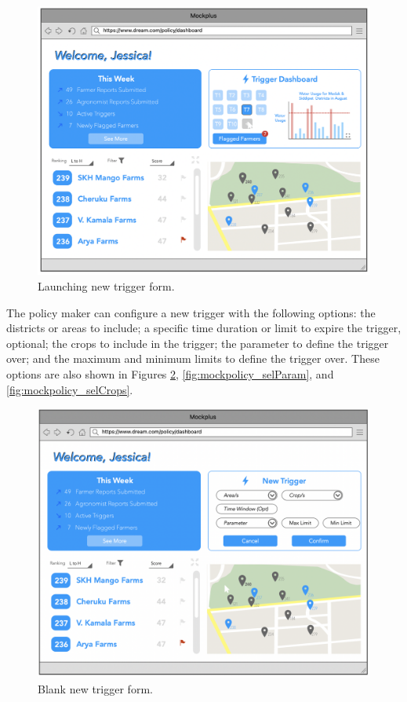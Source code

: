 \begin{figure}[H]
\centering
\includegraphics[scale=0.37]{../images_diagrams/mock_ups/dd/Trig01_NewTrig.png}
\caption{\label{fig:mockpolicy_newtrig}Launching new trigger form.}
\end{figure}

\clearpage
\noindent
The policy maker can configure a new trigger with the following options: the districts or areas to include; a specific time duration or limit to expire the trigger, optional; the crops to include in the trigger; the parameter to define the trigger over; and the maximum and minimum limits to define the trigger over. These options are also shown in Figures \ref{fig:mockpolicy_form}, \ref{fig:mockpolicy_selParam}, and \ref{fig:mockpolicy_selCrops}. 

\begin{figure}[H]
\centering
\includegraphics[scale=0.35]{../images_diagrams/mock_ups/dd/Trig02_SetUp.png}
\caption{\label{fig:mockpolicy_form}Blank new trigger form.}
\end{figure}

